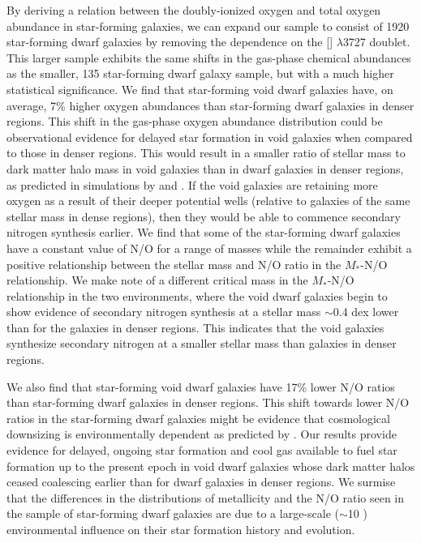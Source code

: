 By deriving a relation between the doubly-ionized oxygen and total oxygen 
abundance in star-forming galaxies, we can expand our sample to consist of 1920 
star-forming dwarf galaxies by removing the dependence on the [] 
$\lambda$3727 doublet.  This larger sample exhibits the same shifts in the 
gas-phase chemical abundances as the smaller, 135 star-forming dwarf galaxy 
sample, but with a much higher statistical significance.  We find that 
star-forming void dwarf galaxies have, on average, 7\% higher oxygen abundances 
than star-forming dwarf galaxies in denser regions.  This shift in the gas-phase 
oxygen abundance distribution could be observational evidence for delayed star 
formation in void galaxies when compared to those in denser regions.  This would 
result in a smaller ratio of stellar mass to dark matter halo mass in void 
galaxies than in dwarf galaxies in denser regions, as predicted in simulations 
by \cite{Jung14} and \cite{Tonnesen15}.  If the void galaxies are retaining more 
oxygen as a result of their deeper potential wells (relative to galaxies of the 
same stellar mass in dense regions), then they would be able to commence 
secondary nitrogen synthesis earlier.  We find that some of the star-forming 
dwarf galaxies have a constant value of N/O for a range of masses while the 
remainder exhibit a positive relationship between the stellar mass and N/O ratio 
in the $M_*$-N/O relationship.  We make note of a different critical mass in the 
$M_*$-N/O relationship in the two environments, where the void dwarf galaxies 
begin to show evidence of secondary nitrogen synthesis at a stellar mass 
$\sim$0.4 dex lower than for the galaxies in denser regions.  This indicates 
that the void galaxies synthesize secondary nitrogen at a smaller stellar mass 
than galaxies in denser regions.

We also find that star-forming void dwarf galaxies have 17\% lower N/O ratios 
than star-forming dwarf galaxies in denser regions.  This shift towards lower 
N/O ratios in the star-forming dwarf galaxies might be evidence that 
cosmological downsizing is environmentally dependent as predicted by 
\cite{Cen11}.  Our results provide evidence for delayed, ongoing star formation 
and cool gas available to fuel star formation up to the present epoch in void 
dwarf galaxies whose dark matter halos ceased coalescing earlier than for dwarf 
galaxies in denser regions.  We surmise that the differences in the 
distributions of metallicity and the N/O ratio seen in the sample of 
star-forming dwarf galaxies are due to a large-scale ($\sim$10 \hMpc) 
environmental influence on their star formation history and evolution.  

